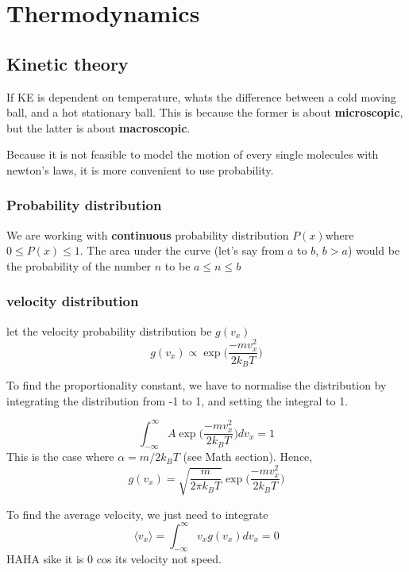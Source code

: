 \chapter{Thermodynamics}
\section{Kinetic theory}
If KE is dependent on temperature, whats the difference between a cold moving ball, and a hot stationary ball. This is because the former is about \textbf{microscopic}, but the latter is about \textbf{macroscopic}. 

Because it is not feasible to model the motion of every single molecules with newton's laws, it is more convenient to use probability.

\subsection{Probability distribution}
We are working with \textbf{continuous} probability distribution $P(x) $where $0 \leq P(x) \leq 1$. The area under the curve (let's say from $a$ to $b$, $b>a$) would be the probability of the number $n$ to be $a\leq n\leq b$

\subsection{velocity distribution}
let the velocity probability distribution be $g(v_x)$
\begin{equation}
    g(v_x)\propto \exp\bigg({\frac{-mv_x^2}{2k_B T}}\bigg)
\end{equation}

To find the proportionality constant, we have to normalise the distribution by integrating the distribution from -1 to 1, and setting the integral to 1.

\begin{equation}
    \int_{-\infty}^{\infty}A\exp\bigg({\frac{-mv_x^2}{2k_B T}}\bigg)dv_x = 1
\end{equation}
This is the case where $\alpha=m/2k_BT$ (see Math section). Hence,
\begin{equation}
    g(v_x)=\sqrt{\frac{m}{2\pi k_B T}}\exp\bigg({\frac{-mv_x^2}{2k_BT}}\bigg)
\end{equation} 

To find the average velocity, we just need to integrate 
\begin{equation}
    \langle v_x \rangle =\int_{-\infty}^{\infty}v_xg(v_x)dv_x=0
\end{equation}
HAHA sike it is 0 cos its velocity not speed.

